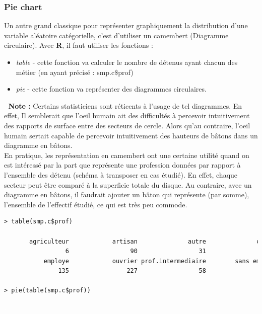 \subsubsection{Pie chart}
Un autre grand classique pour représenter graphiquement la distribution d'une variable aléatoire catégorielle, c'est d'utiliser un camembert (Diagramme circulaire). Avec \textbf{R}, il faut utiliser les fonctions : 
\begin{itemize}
\item \textit{table} - cette fonction va calculer le nombre de détenus ayant chacun des métier (en ayant précisé : smp.c\$prof) 
\item \textit{pie} - cette fonction va représenter des diagrammes circulaires.
\end{itemize}
\textcolor{white}{.}\newline
\textbf{Note : }Certains statisticiens sont réticents à l'usage de tel diagrammes. En effet, Il semblerait que l'oeil humain ait des difficultés à percevoir intuitivement des rapports de surface entre des secteurs de cercle. Alors qu'au contraire, l'oeil humain sertait capable de percevoir intuitivement des hauteurs de bâtons dans un diagramme en bâtons. \newline
\\
En pratique, les représentation en camembert ont une certaine utilité quand on est intéressé par la part que représente une profession données par rapport à l'ensemble des détenu (schéma à transposer en cas étudié).  En effet, chaque secteur peut être comparé à la superficie totale du disque. \newline
Au contraire, avec un diagramme en bâtons, il faudrait ajouter un bâton qui représente (par somme), l'ensemble de l'effectif étudié, ce qui est très peu commode.
\begin{lstlisting}[language=html]
> table(smp.c$prof)

       agriculteur            artisan              autre              cadre 
                 6                 90                 31                 24 
           employe            ouvrier prof.intermediaire        sans emploi 
               135                227                 58                222 

> pie(table(smp.c$prof))
\end{lstlisting}
\textcolor{white}{.}\newline
